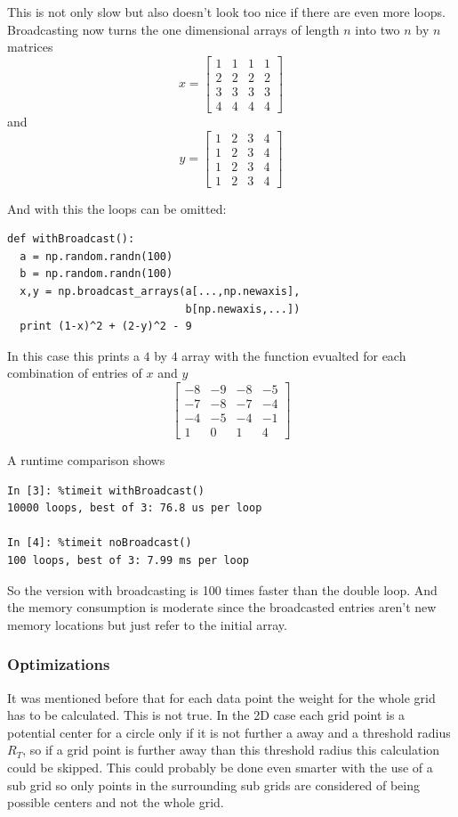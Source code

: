\documentclass[11pt]{scrreprt}
\begin{document}
This is not only slow but also doesn't look too nice if there are even more loops.
Broadcasting now turns the one dimensional arrays of length $n$ into two $n\text{ by }n$ matrices
\[
  x = \begin{bmatrix}
  1 & 1 & 1 & 1 \\
  2 & 2 & 2 & 2 \\
  3 & 3 & 3 & 3\\
  4 & 4 & 4 & 4
  \end{bmatrix}
\]
and
\[
  y = \begin{bmatrix}
  1 & 2 & 3 & 4 \\
  1 & 2 & 3 & 4 \\
  1 & 2 & 3 & 4 \\
  1 & 2 & 3 & 4 
\end{bmatrix}
\]
\noindent\begin{minipage}{\linewidth}
And with this the loops can be omitted:
\begin{lstlisting}
def withBroadcast():
  a = np.random.randn(100)
  b = np.random.randn(100) 
  x,y = np.broadcast_arrays(a[...,np.newaxis],
                            b[np.newaxis,...])
  print (1-x)^2 + (2-y)^2 - 9
\end{lstlisting}  
\end{minipage}
In this case this prints a $4$ by $4$ array with the function evualted for each combination of entries of $x$ and $y$
\[
  \begin{bmatrix}
    -8& -9& -8& -5\\
    -7& -8& -7& -4\\
    -4& -5& -4& -1\\
     1&  0&  1&  4
       \end{bmatrix}
\]
%
\begin{minipage}{\linewidth}
A runtime comparison shows   
\begin{lstlisting}
In [3]: %timeit withBroadcast()
10000 loops, best of 3: 76.8 us per loop

In [4]: %timeit noBroadcast()
100 loops, best of 3: 7.99 ms per loop
\end{lstlisting}
So the version with broadcasting is 100 times faster than the double loop. And the memory consumption is moderate since the 
broadcasted entries aren't new memory locations but just refer to the initial array.
\end{minipage}


\subsubsection{Optimizations} %
\label{ssub:optimizations}
It was mentioned before that for each data point the weight for the whole grid has to be calculated. This is not true. In the 2D case 
each grid point is a potential center for a circle only if it is not further a away and a threshold radius $R_T$, so if a grid point is 
further away than this threshold radius this calculation could be skipped. This could probably be done even smarter with the use of a 
sub grid so only points in the surrounding sub grids are considered of being possible centers and not the whole grid.
\end{document}
